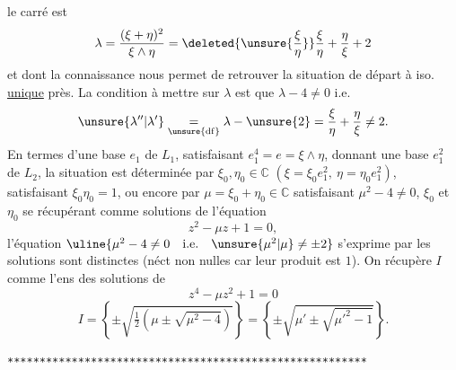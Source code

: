 le carré est
\[
 \lambda=\frac{(\xi+\eta)^2}{\xi\wedge\eta}
 =\deleted{\unsure{\frac{\xi}{\eta}}}\frac{\xi}{\eta}+\frac{\eta}{\xi}+2
\]
et dont la connaissance nous permet de retrouver la situation de départ à iso.
\uline{unique} près. La condition à mettre sur
$\lambda$ est que $\lambda-4\ne0$ i.e.
\[
 \unsure{\lambda''|\lambda'}\underset{\unsure{\mathrm{df}}}{=}\lambda-
 \unsure{2}= \frac{\xi}{\eta}+\frac{\eta}{\xi}\ne2.
\]
En termes d'une base  $e_1$ de $L_1$,
satisfaisant $e_1^4=e=\xi\wedge\eta$, donnant une base $e_1^2$ de $L_2$,
la situation est déterminée par 
$\xi_0,\eta_0\in\mathbb C$ $(\xi=\xi_0e_1^2,\ \eta=\eta_0e_1^2)$,
satisfaisant $\xi_0\eta_0=1$, ou encore par
$\mu=\xi_0+\eta_0\in\mathbb C$ satisfaisant $\mu^2-4\ne0$,
$\xi_0$ et $\eta_0$ se récupérant comme solutions de l'équation
\[
 z^2-\mu z+1=0,
\]
l'équation $\uline{\mu^2-4\ne0\quad\text{i.e.}\quad\unsure{\mu^2|\mu}\ne\pm2}$
s'exprime par les  solutions sont distinctes (néct non nulles car leur
produit est $1$).  On récupère $I$ comme l'ens des solutions de
\[
 z^4-\mu z^2+1=0
\]
\[
 I=\left\{\pm\sqrt{\tfrac12\left(\mu\pm\sqrt{\mu^2-4}\right)}\right\}
 =\left\{\pm\sqrt{\mu'\pm\sqrt{\mu'^2-1}}\right\}.
\]
  
  

 

\texttt{********************************************************}

 

 

 

 

 
 

